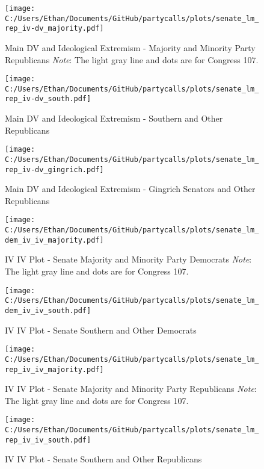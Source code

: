 \documentclass[12pt]{article}
\begin{document}
\begin{figure}[h]
	\caption{Main DV and Ideological Extremism - Majority and Minority Party Republicans \textit{Note}: The light gray line and dots are for Congress 107.}
	\texttt{[image: C:/Users/Ethan/Documents/GitHub/partycalls/plots/senate\_lm\_rep\_iv-dv\_majority.pdf]}
\end{figure}

\begin{figure}[h]
	\caption{Main DV and Ideological Extremism - Southern and Other Republicans}
	\texttt{[image: C:/Users/Ethan/Documents/GitHub/partycalls/plots/senate\_lm\_rep\_iv-dv\_south.pdf]}
\end{figure}

\begin{figure}[h]
	\caption{Main DV and Ideological Extremism - Gingrich Senators and Other Republicans}
	\texttt{[image: C:/Users/Ethan/Documents/GitHub/partycalls/plots/senate\_lm\_rep\_iv-dv\_gingrich.pdf]}
\end{figure}

\begin{figure}[!htbp]
	\caption{IV IV Plot - Senate Majority and Minority Party Democrats \textit{Note}: The light gray line and dots are for Congress 107.}
	\texttt{[image: C:/Users/Ethan/Documents/GitHub/partycalls/plots/senate\_lm\_dem\_iv\_iv\_majority.pdf]}
\end{figure}

\begin{figure}[!htbp]
	\caption{IV IV Plot - Senate Southern and Other Democrats}
	\texttt{[image: C:/Users/Ethan/Documents/GitHub/partycalls/plots/senate\_lm\_dem\_iv\_iv\_south.pdf]}
\end{figure}

\begin{figure}[!htbp]
	\caption{IV IV Plot - Senate Majority and Minority Party Republicans \textit{Note}: The light gray line and dots are for Congress 107.}
	\texttt{[image: C:/Users/Ethan/Documents/GitHub/partycalls/plots/senate\_lm\_rep\_iv\_iv\_majority.pdf]}
\end{figure}

\begin{figure}[!htbp]
	\caption{IV IV Plot - Senate Southern and Other Republicans}
	\texttt{[image: C:/Users/Ethan/Documents/GitHub/partycalls/plots/senate\_lm\_rep\_iv\_iv\_south.pdf]}
\end{figure}
\end{document}
